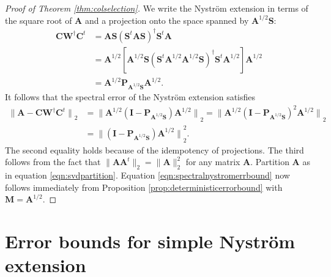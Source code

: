 \documentclass[11pt,letterpaper,twoside,reqno,nosumlimits]{amsart}
\newcommand{\mat}[1]{\ensuremath{\bm{#1}}}
\newcommand{\norm}[1]{\ensuremath{\big\|#1\big\|}}
\theoremstyle{remark}
\begin{document}
\begin{proof}[Proof of Theorem \ref{thm:colselection}]
We write the Nystr\"om extension in terms of the square root of $\mat{A}$ and a projection onto the space spanned by $\mat{A}^{1/2} \mat{S}:$
\begin{align*}
  \mat{C} \mat{W}^\dagger \mat{C}^t & = \mat{A} \mat{S} (\mat{S}^t \mat{A} \mat{S})^\dagger \mat{S}^t \mat{A} \\
  & = \mat{A}^{1/2} [\mat{A}^{1/2} \mat{S} (\mat{S}^t \mat{A}^{1/2} \mat{A}^{1/2} \mat{S})^\dagger \mat{S}^t \mat{A}^{1/2}] \mat{A}^{1/2} \\
  & = \mat{A}^{1/2} \mat{P}_{\mat{A}^{1/2} \mat{S}} \mat{A}^{1/2}.
\end{align*}
It follows that the spectral error of the Nystr\"om extension satisfies
\begin{align*}
  \norm{\mat{A} - \mat{C} \mat{W}^\dagger \mat{C}^t}_2 & = \norm{\mat{A}^{1/2} ( \mat{I} - \mat{P}_{\mat{A}^{1/2}\mat{S}}) \mat{A}^{1/2}}_2  = \norm{\mat{A}^{1/2} ( \mat{I} - \mat{P}_{\mat{A}^{1/2}\mat{S}})^2 \mat{A}^{1/2}}_2\\ 
 & = \norm{( \mat{I} - \mat{P}_{\mat{A}^{1/2}\mat{S}}) \mat{A}^{1/2}}_2^2.
\end{align*}
The second equality holds because of the idempotency of projections. The third follows from the fact that $\|\mat{A}\mat{A}^t\|_2 = \|\mat{A}\|_2^2$ for any matrix $\mat{A}.$ Partition $\mat{A}$ as in equation \eqref{eqn:svdpartition}. Equation \eqref{eqn:spectralnystromerrbound} now follows immediately from Proposition \ref{prop:deterministicerrorbound} with $\mat{M} = \mat{A}^{1/2}.$
\end{proof}

\section{ Error bounds for simple Nystr\"om extension}
\label{sec:naiveproof}
\end{document}
